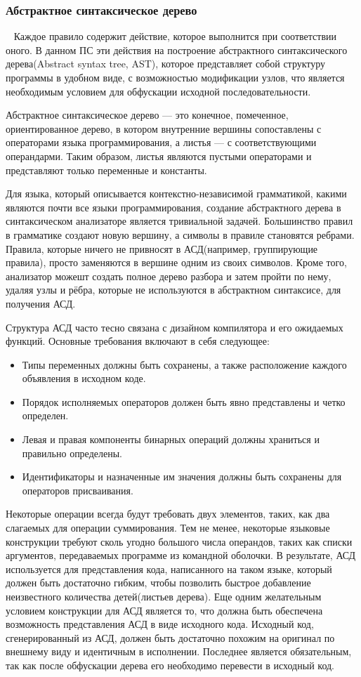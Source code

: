 \subsubsection{Абстрактное синтаксическое дерево}~
\label{sub:arch_and_mod:ast}
Каждое правило содержит действие, которое выполнится при соответствии оного. В данном ПС эти действия на построение абстрактного синтаксического дерева(Abstract syntax tree, AST), которое представляет собой структуру программы в удобном виде, с возможностью модификации узлов, что является необходимым условием для обфускации исходной последовательности.

Абстрактное синтаксическое дерево --- это конечное, помеченное, ориентированное дерево, в котором внутренние вершины сопоставлены с операторами языка программирования, а листья --- с соответствующими операндарми. Таким образом, листья являются пустыми операторами и представляют только переменные и константы.

Для языка, который описывается контекстно-независимой грамматикой, какими являются почти все языки программирования, создание абстрактного дерева в синтаксическом анализаторе является тривиальной задачей. Большинство правил в грамматике создают новую вершину, а символы в правиле становятся ребрами. Правила, которые ничего не привносят в АСД(например, группирующие правила), просто заменяются в вершине одним из своих символов. Кроме того, анализатор можешт создать полное дерево разбора и затем пройти по нему, удаляя узлы и рёбра, которые не используются в абстрактном синтаксисе, для получения АСД.

Структура АСД часто тесно связана с дизайном компилятора и его ожидаемых функций.
Основные требования включают в себя следующее:
\begin{itemize}
\item  Типы переменных должны быть сохранены, а также расположение каждого объявления в исходном коде.
\item  Порядок исполняемых операторов должен быть явно представлены и четко определен.
\item  Левая и правая компоненты бинарных операций должны храниться и правильно определены.
\item  Идентификаторы и назначенные им значения должны быть сохранены для операторов присваивания.
\end{itemize}

Некоторые операции всегда будут требовать двух элементов, таких, как два слагаемых для операции суммирования. Тем не менее, некоторые языковые конструкции требуют сколь угодно большого числа операндов, таких как списки аргументов, передаваемых программе из командной оболочки. В результате, АСД используется для представления кода, написанного на таком языке, который должен быть достаточно гибким, чтобы позволить быстрое добавление неизвестного количества детей(листьев дерева).
Еще одним желательным условием конструкции для АСД является то, что должна быть обеспечена возможность представления АСД в виде исходного кода. Исходный код, сгенерированный из АСД, должен быть достаточно похожим на оригинал по внешнему виду и идентичным в исполнении. Последнее является обязательным, так как после обфускации дерева его необходимо перевести в исходный код.

